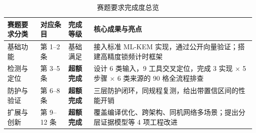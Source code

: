 \begin{table}[H]
\centering
\caption{赛题要求完成度总览}
\label{tab:req_summary}
{\footnotesize
\renewcommand{\arraystretch}{1.15}
\begin{tabularx}{\textwidth}{|>{\centering\arraybackslash}p{2.2cm}|>{\centering\arraybackslash}p{1.8cm}|>{\centering\arraybackslash}p{1.8cm}|>{\raggedright\arraybackslash}X|}
\hline
\textbf{赛题要求分类} & \textbf{对应条目} & \textbf{完成等级} & \textbf{核心成果与亮点} \\
\hline
基础功能 & 第 1--2 条 & 基础满足 & 接入标准 ML-KEM 实现，通过公开向量验证；搭建高精度锁频计时框架 \\
\hline
检测与定位 & 第 3--5 条 & \textbf{超额完成} & 设计 6 类输入，9 工具交叉定位，完成 3 实现 $\times$ 5 步骤 $\times$ 6 类来源的 90 格全流程排查 \\
\hline
防护与验证 & 第 6--8 条 & \textbf{超额完成} & 三层防护闭环，同规程复测，给出带置信区间的性能开销 \\
\hline
扩展与创新 & 第 9--12 条 & \textbf{超额完成} & 覆盖编译优化、跨架构、同机网络多场景；提出分层证据模型等 4 项工程改进 \\
\hline
\end{tabularx}
\par{}
}
\end{table}
